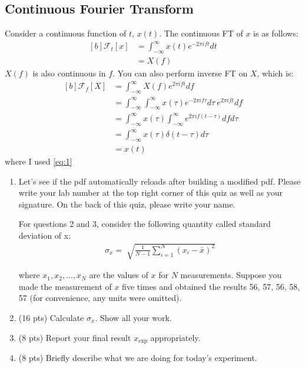 \documentclass[letterpaper, 11pt]{article}
\newcommand{\fourier}[2]{\mathcal{F}_{#1}[#2]}
\newcommand{\fint}{\int_{-\infty}^{\infty}}
\numberwithin{equation}{section}
\begin{document}
\subsection{Continuous Fourier Transform}
Consider a continuous function of \(t\), \(x(t)\). The continuous FT of \(x\) is as follows:
\begin{equation}
	\begin{aligned}[b]
		\fourier{t}{x}	&= \fint x(t)e^{-2\pi ift} dt \\
				&= X(f)
	\end{aligned}
\end{equation}
\(X(f)\) is also continuous in \(f\). You can also perform inverse FT on \(X\), which is:
\begin{equation}
	\begin{aligned}[b]
		\fourier{f}{X}	&= \fint X(f)e^{2\pi ift} df \\
				&= \fint \fint x(\tau)e^{-2\pi if\tau} d\tau\ e^{2\pi ift} df \\
				&= \fint x(\tau) \fint e^{2\pi if(t - \tau)} df d\tau \\
				&= \fint x(\tau) \delta (t - \tau) d\tau \\
				&= x(t)
	\end{aligned}
\end{equation}
where I used \eqref{eq:1}
\begin{enumerate}
	\item Let's see if the pdf  automatically reloads after building a modified pdf. Please write your lab number at the top right corner of this quiz as well as your signature. On the back of this quiz, please write your name.\vspace{0.25cm}

For questions 2 and 3, consider the following quantity called standard deviation of x:
	\begin{align}
			\sigma_{x} = \sqrt[]{\frac{1}{N - 1} \sum_{i = 1}^{N} (x_{i} - \bar{x})^{2}}
	\end{align}
	
where \(x_{1}, x_{2}, \dots, x_{N}\) are the values of \(x\) for \(N\) measurements. Suppose you made the measurement of \(x\) five times and obtained the results 56, 57, 56, 58, 57 (for convenience, any units were omitted).

	\item (16 pts) Calculate \(\sigma_{x}\). Show all your work. 
	
	\item (8 pts) Report your final result \(x_{\text{exp}}\) appropriately. 
	
	\item (8 pts) Briefly describe what we are doing for today's experiment.   
\end{enumerate}
\printindex
\end{document}
